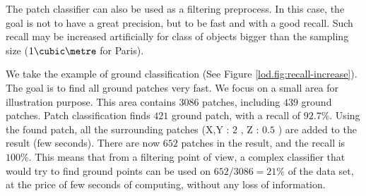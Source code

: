 		The patch classifier can also be used as a filtering preprocess.
		In this case, the goal is not to have a great precision, but to be fast and with a good recall.
		Such recall may be increased artificially for class of objects bigger than the sampling size ($1\cubic\metre$ for Paris).
		
		We take the example of ground classification (See Figure \ref{lod.fig:recall-increase}). 
		The goal is to find all ground patches very fast.
		We focus on a small area for illustration purpose. This area contains $3086$ patches, including $439$ ground patches.
		Patch classification finds $421$ ground patch, 
		with a recall of $92.7$\%.
		Using the found patch, all the surrounding patches (X,Y : $2$ \meter, Z : $0.5$ \meter ) are added to the result (few seconds).
		There are now $652$ patches in the result, and the recall is $100$\%.
		This means that from a filtering point of view, a complex classifier that would try to find ground points can be used on $652/3086=21\%$ of the data set, at the price of few seconds of computing, without any loss of information.
		
		
					 	  